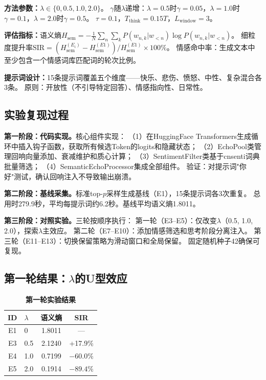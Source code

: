 \documentclass[a4paper, 11pt]{article}
\begin{document}
\textbf{方法参数：}$\lambda\in\{0,0.5,1.0,2.0\}$。
$\gamma$随$\lambda$递增：$\lambda=0.5$时$\gamma=0.05$，$\lambda=1.0$时$\gamma=0.1$，$\lambda=2.0$时$\gamma=0.5$。
$\tau=0.1$，$T_{\text{think}}=0.15T$，$L_{\text{window}}=3$。

\textbf{评估指标：}语义熵$H_{\text{sem}}=-\frac{1}{N}\sum_n\sum_k P(w_{n,k}|w_{<n})\log P(w_{n,k}|w_{<n})$。
细粒度提升率$\text{SIR}=(H_{\text{sem}}^{(E_i)}-H_{\text{sem}}^{(E1)})/H_{\text{sem}}^{(E1)}\times100\%$。
情感命中率：生成文本中至少包含一个情感词库匹配词的轮次比例。

\textbf{提示词设计：}15条提示词覆盖五个维度——快乐、悲伤、愤怒、中性、复杂混合各3条。
原则：开放性（不引导特定回答）、情感指向性、日常性。

\subsection{实验复现过程}

\textbf{第一阶段：代码实现。}核心组件实现：
（1）在HuggingFace Transformers生成循环中插入钩子函数，获取所有候选Token的logits和隐藏状态；
（2）EchoPool类管理回响向量添加、衰减维护和质心计算；
（3）SentimentFilter类基于cnsenti词典批量筛选；
（4）SemanticEchoProcessor集成全部组件。
验证：对提示词"你好"测试，确认回响注入不导致输出崩溃。

\textbf{第二阶段：基线采集。}标准top-$p$采样生成基线（E1），15条提示词各3次重复。
总用时279.9秒，平均每提示词约6.2秒。基线平均语义熵1.8011。

\textbf{第三阶段：对照实验。}三轮按顺序执行：
第一轮（E3--E5）：仅改变$\lambda$（0.5, 1.0, 2.0），探索$\lambda$主效应。
第二轮（E7--E10）：添加情感筛选和思考阶段分离注入。
第三轮（E11--E13）：切换保留策略为滑动窗口和全局保留。
固定随机种子42确保可复现。

\subsection{第一轮结果：$\lambda$的U型效应}

\begin{table}[ht]
  \centering\caption{\textbf{第一轮实验结果}}\label{tab:r1}\small
  \begin{tabular}{clcc}\toprule
    ID & $\lambda$ & 语义熵 & SIR\\\midrule
    E1 & 0 & 1.8011 & ---\\
    E3 & 0.5 & 2.1240 & +17.9\%\\
    E4 & 1.0 & 0.7199 & $-60.0\%$\\
    E5 & 2.0 & 0.1914 & $-89.4\%$\\\bottomrule
  \end{tabular}
\end{table}
\end{document}
